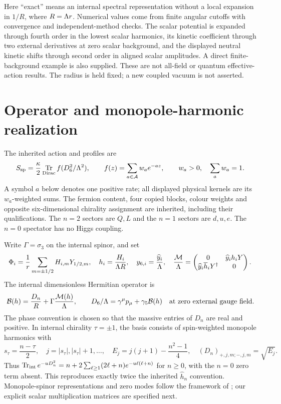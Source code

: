 \documentclass[11pt,letterpaper]{article}
\DeclareMathOperator{\Tr}{Tr}\DeclareMathOperator{\diag}{diag}
\newcommand{\M}{\mathcal M}\newcommand{\B}{\mathcal B}
\begin{document}
Here ``exact'' means an internal spectral representation without a local expansion in $1/R$, where $R=\Lambda r$. Numerical values come from finite angular cutoffs with convergence and independent-method checks. The scalar potential is expanded through fourth order in the lowest scalar harmonics, its kinetic coefficient through two external derivatives at zero scalar background, and the displayed neutral kinetic shifts through second order in aligned scalar amplitudes. A direct finite-background example is also supplied. These are not all-field or quantum effective-action results. The radius is held fixed; a new coupled vacuum is not asserted.

\section{Operator and monopole-harmonic realization}

The inherited action and profiles are
\begin{equation}
 S_{\rm sp}=\frac{\kappa}{2}\Tr_{\rm Dirac}f(D_6^2/\Lam^2),\qquad
 f(z)=\sum_{a\in\mathcal A}w_a e^{-az},\qquad w_a>0,\quad\sum_aw_a=1.
 \label{eq:action}
\end{equation}
A symbol $a$ below denotes one positive rate; all displayed physical kernels are its $w_a$-weighted sums. The fermion content, four copied blocks, colour weights and opposite six-dimensional chirality assignment are inherited, including their qualifications. The $n=2$ sectors are $Q,L$ and the $n=1$ sectors are $d,u,e$. The $n=0$ spectator has no Higgs coupling.

Write $\Gamma=\sigma_3$ on the internal spinor, and set
\begin{equation}
 \Phi_i=\frac1r\sum_{m=\pm1/2}H_{i,m}Y_{1/2,m},\quad
 h_i=\frac{H_i}{\Lam R},\quad y_{6,i}=\frac{\widehat y_i}{\Lam},\quad
 \frac{\M}{\Lam}=\begin{pmatrix}0&\widehat y_i h_iY\\
 \widehat y_i\overline h_iY^\dagger&0\end{pmatrix}.
 \label{eq:units}
\end{equation}
The internal dimensionless Hermitian operator is
\begin{equation}
 \B(h)=\frac{D_n}{R}+\Gamma\frac{\M(h)}{\Lam},\qquad
 D_6/\Lam=\gamma^\mu p_\mu+\gamma_5\B(h)
 \quad\hbox{at zero external gauge field}.\label{eq:B}
\end{equation}
The phase convention is chosen so that the massive entries of $D_n$ are real and positive. In internal chirality $\tau=\pm1$, the basis consists of spin-weighted monopole harmonics with
\begin{equation}
 s_\tau=\frac{n-\tau}{2},\quad j=|s_\tau|,|s_\tau|+1,\ldots,\quad
 E_j=j(j+1)-\frac{n^2-1}{4},\quad
 (D_n)_{+,j,m;-,j,m}=\sqrt{E_j}.
 \label{eq:monopole}
\end{equation}
Thus $\Tr_{\rm int}e^{-uD_n^2}=n+2\sum_{\ell\ge1}(2\ell+n)e^{-u\ell(\ell+n)}$ for $n\ge0$, with the $n=0$ zero term absent. This reproduces exactly twice the inherited $\widehat h_n$ convention. Monopole-spinor representations and zero modes follow the framework of \cite{Jante}; our explicit scalar multiplication matrices are specified next.
\end{document}
